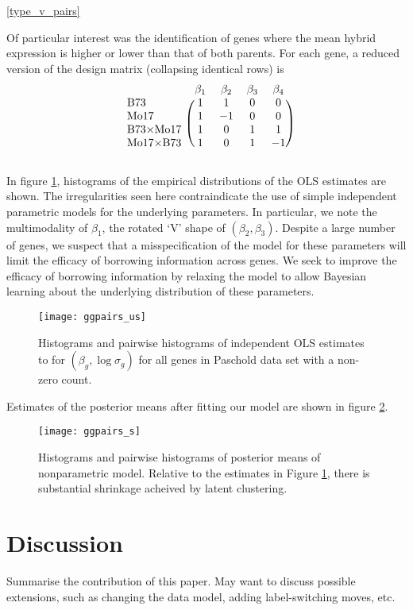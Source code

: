 \ref{type_v_pairs}  




Of particular interest was the identification of genes where the mean hybrid expression is higher or lower than that of both parents. For each gene, a reduced version of the design matrix (collapsing identical rows) is
\begin{equation*}
\begin{blockarray}{lcccc}
  & \beta_1 & \beta_2 & \beta_3 & \beta_4\\
  \begin{block}{l(cccc)}
  \mbox{B73} & 1 & 1 & 0 & 0\\
  \mbox{Mo17} & 1 & -1 & 0 & 0\\
  \mbox{B73$\times$Mo17} & 1 & 0 & 1 & 1\\
  \mbox{Mo17$\times$B73} & 1 & 0 & 1 & -1\\
  \end{block}
\end{blockarray}
\label{design}
\end{equation*}

In figure \ref{ggpairs_us}, histograms of the empirical distributions of the OLS estimates are shown. The irregularities seen here contraindicate the use of simple independent parametric models for the underlying parameters. In particular, we note the multimodality of $\beta_1$, the rotated `V' shape of $(\beta_2,\beta_3)$. Despite a large number of genes, we suspect that a misspecification of the model for these parameters will limit the efficacy of borrowing information across genes. We seek to improve the efficacy of borrowing information by relaxing the model to allow Bayesian learning about the underlying distribution of these parameters.
\begin{figure}
\texttt{[image: ggpairs\_us]}
\caption{Histograms and pairwise histograms of independent OLS
  estimates to for $(\beta_g,\log \sigma_g)$ for all genes in Paschold data set with a non-zero count.}
\label{ggpairs_us}
\end{figure}

Estimates of the posterior means after fitting our model are shown in figure \ref{ggpairs_s}.
\begin{figure}
\texttt{[image: ggpairs\_s]}
\caption{Histograms and pairwise histograms of posterior means of
  nonparametric model. Relative to the estimates in Figure
  \ref{ggpairs_us}, there is substantial shrinkage acheived by latent
  clustering.}
\label{ggpairs_s}
\end{figure}

\section{Discussion}
Summarise the contribution of this paper. May want to discuss possible extensions, such as changing the data model, adding label-switching moves, etc.




